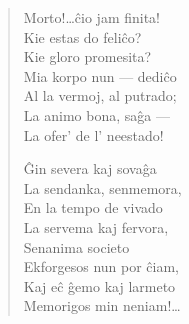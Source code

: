 \begin{verse}
                     Morto!\dots \^cio jam finita!\\
                     Kie estas do feli\^co?\\
                     Kie gloro promesita?\\
                     Mia korpo nun --- dedi\^co\\
                     Al la vermoj, al putrado;\\
                     La animo bona, sa\^ga ---\\
                     La ofer' de l' neestado!

                     \^Gin severa kaj sova\^ga\\
                     La sendanka, senmemora,\\
                     En la tempo de vivado\\
                     La servema kaj fervora,\\
                     Senanima societo\\
                     Ekforgesos nun por \^ciam,\\
                     Kaj e\^c \^gemo kaj larmeto\\
                     Memorigos min neniam!\dots

\end{verse}

\smallrule{}
